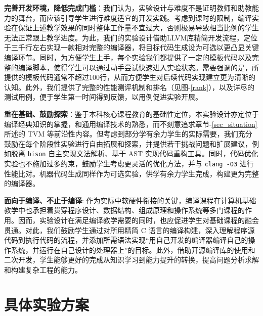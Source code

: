 \documentclass{SCIS2020cn}
\begin{document}
\textbf{完善开发环境，降低完成门槛}：我们认为，实验设计与难度不是证明教师和助教能力的舞台，而应该引导学生进行难度适宜的开发实践。考虑到课时的限制，编译实验在保证上述教学效果的同时整体工作量不宜过大，否则极易导致相当比例的学生无法正常跟上教学进度。为此，我们的实验设计借助LLVM库精简开发流程，定位于三千行左右实现一款相对完整的编译器，将目标代码生成设为可选以更凸显关键编译环节。同时，为方便学生上手，每个实验我们都提供了一定的模板代码以及完整的编译脚本，使得学生可以通过动手尝试快速进入实验状态。需要强调的是，所提供的模板代码通常不超过100行，从而方便学生对后续代码实现建立更为清晰的认知。此外，我们提供了完整的性能测评机制和排名（见图-\ref{rank}），以及详尽的测试用例，便于学生第一时间得到反馈，以用例促进实验开展。

\textbf{重在基础、鼓励探索}：鉴于本科核心课程教育的基础性定位，本实验设计亦定位于编译经典知识的掌握，和通用编译技术的熟悉，而不刻意追求章节-\ref{sec_situation} 所述的 TVM 等前沿性内容。但考虑到部分学有余力学生的实际需要，我们充分鼓励在每个阶段性实验进行自由拓展和探索，并提供若干挑战问题和扩展建议，例如脱离 \texttt{bison} 自主实现文法解析、基于 AST 实现代码重构工具。同时，代码优化实验也不施加过多约束，鼓励学生考虑更灵活的优化方法，并与 {\tt clang -O3} 进行性能比对。机器代码生成同样作为可选实验，供学有余力学生完成，构建更为完整的编译器。

\textbf{面向于编译、不止于编译}: 作为实际中软硬件衔接的关键，编译课程在计算机基础教学中也承担着贯穿程序设计、数据结构、组成原理和操作系统等多门课程的作用。因而，实验设计在满足编译教学需要的同时，也应促进学生对基础课程的融会贯通。对此，我们鼓励学生通过对所用精简 C 语言的编译构建，深入理解程序源代码到执行代码的流程，并添加所需语法实现“用自己开发的编译器编译自己的操作系统，并运行在自己设计的处理器上”的目标。此外，借助开源编译库的使用和二次开发，学生能够更好的完成从知识学习到能力提升的转换，提高问题分析求解和构建复杂工程的能力。


\section{具体实验方案}
\end{document}
